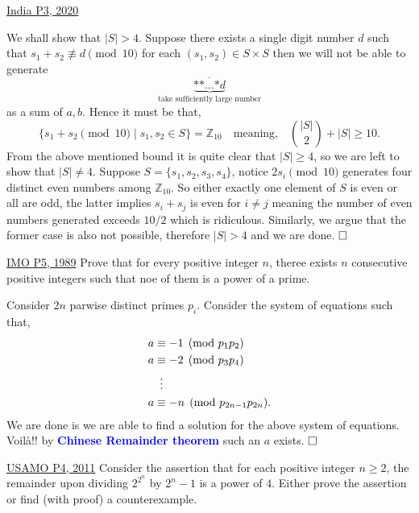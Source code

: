 \begin{problem}{3}{\href{https://artofproblemsolving.com/community/c6h1989008p34732913}{India P3, 2020}}
\begin{solution}
	 We shall show that $|S|>4$. Suppose there exists a single digit number $d$ such that $s_1+s_2\not\equiv d\pmod{10}$ for each $(s_1, s_2)\in S\times S$ then we will not be able to generate
$$\underbrace{\overline{\text{**}\ldots\text{*}d}}_{\text{take sufficiently large number}}$$as a sum of $a,b$. Hence it must be that,
$$\{s_1+s_2\pmod{10} \mid s_1,s_2\in S\}=\mathbb{Z}_{10}\quad\text{meaning,}\quad \binom{|S|}{2}+|S|\ge 10.$$From the above mentioned bound it is quite clear that $|S|\ge 4$, so we are left to show that $|S|\ne 4$. Suppose $S=\{s_1,s_2,s_3,s_4\}$, notice $2s_i\pmod {10}$ generates four distinct even numbers among $\mathbb{Z}_{10}$. So either exactly one element of $S$ is even or all are odd, the latter implies $s_i+s_j$ is even for $i\ne j$ meaning the number of even numbers generated exceeds $10/2$ which is ridiculous. Similarly, we argue that the former case is also not possible, therefore $|S|>4$ and we are done. $\qedwhite$

	\end{solution}
\end{problem}
	

\begin{problem}{4}{\href{https://artofproblemsolving.com/community/c6h62176p35923955}{IMO P5, 1989}}
	Prove that for every positive integer $n$, theree exists $n$ consecutive positive integers such that noe of them is a power of a prime.
	\begin{solution} Consider $2n$ parwise distinct primes $p_i$. Consider the system of equations such that,
		\begin{align*}
			a &\equiv -1\pmod {p_1p_2}\\
			a &\equiv -2\pmod {p_3p_4}\\
			& \vdotswithin{\equiv}\\
			a &\equiv -n\pmod {p_{2n-1}p_{2n}}.
		\end{align*}
	\indent We are done is we are able to find a solution for the above system of equations. Voilà!! by \textcolor{blue}{\textbf{Chinese Remainder theorem}} such an $a$ exists. $\qedwhite$
	\end{solution}
\end{problem}

\begin{problem}{5}{\href{https://artofproblemsolving.com/community/c5h404354p2254810}{USAMO P4, 2011}}
	Consider the assertion that for each positive integer $n\ge 2$, the remainder upon dividing $2^{2^n}$ by $2^n-1$ is a power of $4$. Either prove the assertion or find (with proof) a counterexample.
	\begin{solution}

	\end{solution}
\end{problem}
